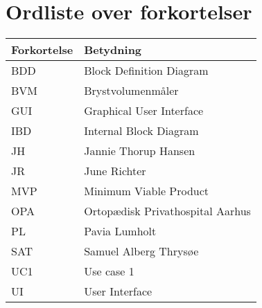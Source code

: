 \section*{Ordliste over forkortelser}

\vspace{1cm}
\begin{table}[hbt]
\centering
\label{ordliste}
\begin{tabular}{|l|l|}
\hline
\textbf{Forkortelse             } & \textbf{Betydning             } \\ \hline
BDD & Block Definition Diagram \\ \hline
BVM & Brystvolumenmåler \\ \hline
GUI & Graphical User Interface \\ \hline
IBD & Internal Block Diagram \\ \hline 
JH & Jannie Thorup Hansen \\ \hline
JR & June Richter  \\ \hline
MVP & Minimum Viable Product \\ \hline
OPA & Ortopædisk Privathospital Aarhus \\ \hline
PL & Pavia Lumholt \\ \hline
SAT & Samuel Alberg Thrysøe \\ \hline
UC1 & Use case 1 \\ \hline
UI & User Interface \\ \hline
\end{tabular}
\end{table}